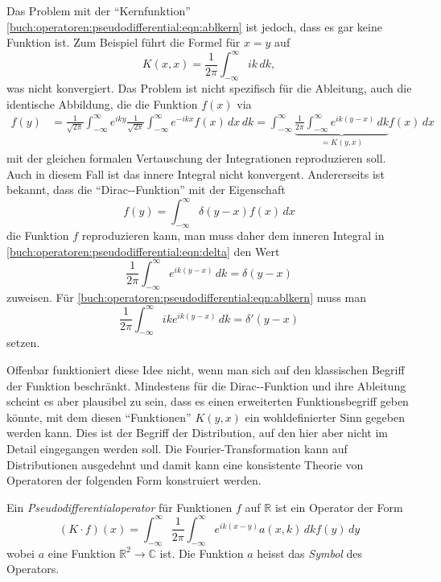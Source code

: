 Das Problem mit der ``Kernfunktion''
\eqref{buch:operatoren:pseudodifferential:eqn:ablkern}
ist jedoch, dass es gar keine Funktion ist.
Zum Beispiel führt die Formel für $x=y$ auf
\[
K(x,x)
=
\frac{1}{2\pi}
\int_{-\infty}^\infty 
ik\,dk,
\]
was nicht konvergiert.
Das Problem ist nicht spezifisch für die Ableitung, auch die identische
Abbildung, die die Funktion $f(x)$ via
\begin{align}
f(y)
&=
\frac{1}{\!\sqrt{2\pi}}
\int_{-\infty}^\infty
e^{iky}
\frac{1}{\!\sqrt{2\pi}}
\int_{-\infty}^\infty
e^{-ikx}
f(x)
\,dx
\,dk
=
\int_{-\infty}^\infty
\underbrace{
\frac{1}{2\pi}
\int_{-\infty}^\infty
e^{ik(y-x)}
\,dk
}_{\displaystyle = K(y,x)}
f(x)
\,dx
\label{buch:operatoren:pseudodifferential:eqn:delta}
\end{align}
mit der gleichen formalen Vertauschung der Integrationen reproduzieren
soll.
Auch in diesem Fall ist das innere Integral nicht konvergent.
Andererseits ist bekannt, dass die ``Dirac-\textdelta-Funktion'' 
mit der Eigenschaft
\[
f(y) = \int_{-\infty}^\infty \delta(y-x) f(x)\,dx
\]
die Funktion $f$ reproduzieren kann, man muss daher dem inneren
Integral in \eqref{buch:operatoren:pseudodifferential:eqn:delta} den
Wert
\[
\frac{1}{2\pi}
\int_{-\infty}^\infty e^{ik(y-x)} \,dk
=
\delta (y-x)
\]
zuweisen.
Für
\eqref{buch:operatoren:pseudodifferential:eqn:ablkern}
muss man
\[
\frac{1}{2\pi}
\int_{-\infty}^\infty ike^{ik(y-x)} \,dk
=
\delta'(y-x)
\]
setzen.

Offenbar funktioniert diese Idee nicht, wenn man sich auf den 
klassischen Begriff der Funktion beschränkt.
Mindestens für die Dirac-\textdelta-Funktion und ihre Ableitung
scheint es aber plausibel zu sein, dass es einen erweiterten
Funktionsbegriff geben könnte, mit dem diesen ``Funktionen'' $K(y,x)$
ein wohldefinierter Sinn gegeben werden kann.
Dies ist der Begriff der Distribution, auf den hier aber nicht
im Detail eingegangen werden soll.
Die Fourier-Transformation kann auf Distributionen ausgedehnt und
damit kann eine konsistente Theorie von Operatoren der folgenden Form
konstruiert werden.

\begin{definition}
Ein {\em Pseudodifferentialoperator} für Funktionen $f$ auf $\mathbb{R}$ ist
ein Operator der Form
\[
(K\cdot f)(x)
=
\int_{-\infty}^\infty
\frac{1}{2\pi}
\int_{-\infty}^\infty
e^{ik(x-y)}
a(x,k)
\,dk
f(y)\,dy
\]
wobei $a$ eine Funktion $\mathbb{R}^2\to\mathbb{C}$ ist.
Die Funktion $a$ heisst das {\em Symbol} des Operators.
\end{definition}

